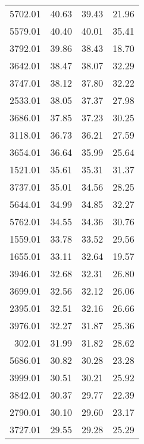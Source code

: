 \begin{table}
\begin{tabular}{rrrr}
5702.01 &            40.63 &            39.43 &            21.96 \\
5579.01 &            40.40 &            40.01 &            35.41 \\
3792.01 &            39.86 &            38.43 &            18.70 \\
3642.01 &            38.47 &            38.07 &            32.29 \\
3747.01 &            38.12 &            37.80 &            32.22 \\
2533.01 &            38.05 &            37.37 &            27.98 \\
3686.01 &            37.85 &            37.23 &            30.25 \\
3118.01 &            36.73 &            36.21 &            27.59 \\
3654.01 &            36.64 &            35.99 &            25.64 \\
1521.01 &            35.61 &            35.31 &            31.37 \\
3737.01 &            35.01 &            34.56 &            28.25 \\
5644.01 &            34.99 &            34.85 &            32.27 \\
5762.01 &            34.55 &            34.36 &            30.76 \\
1559.01 &            33.78 &            33.52 &            29.56 \\
1655.01 &            33.11 &            32.64 &            19.57 \\
3946.01 &            32.68 &            32.31 &            26.80 \\
3699.01 &            32.56 &            32.12 &            26.06 \\
2395.01 &            32.51 &            32.16 &            26.66 \\
3976.01 &            32.27 &            31.87 &            25.36 \\
 302.01 &            31.99 &            31.82 &            28.62 \\
5686.01 &            30.82 &            30.28 &            23.28 \\
3999.01 &            30.51 &            30.21 &            25.92 \\
3842.01 &            30.37 &            29.77 &            22.39 \\
2790.01 &            30.10 &            29.60 &            23.17 \\
3727.01 &            29.55 &            29.28 &            25.29 \\

\end{tabular}
\end{table}
